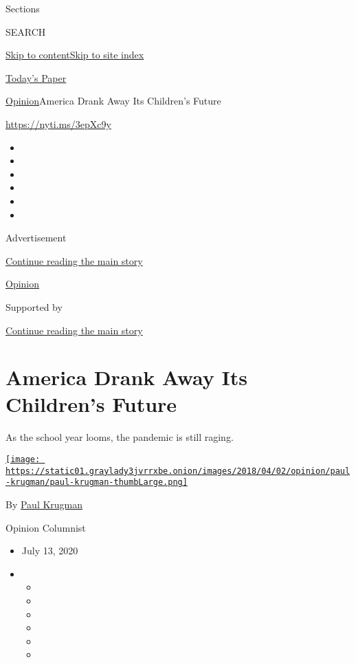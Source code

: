 Sections

SEARCH

\protect\hyperlink{site-content}{Skip to
content}\protect\hyperlink{site-index}{Skip to site index}

\href{https://myaccount.nytimes3xbfgragh.onion/auth/login?response_type=cookie\&client_id=vi}{}

\href{https://www.nytimes3xbfgragh.onion/section/todayspaper}{Today's
Paper}

\href{/section/opinion}{Opinion}\textbar{}America Drank Away Its
Children's Future

\url{https://nyti.ms/3epXc9y}

\begin{itemize}
\item
\item
\item
\item
\item
\item
\end{itemize}

Advertisement

\protect\hyperlink{after-top}{Continue reading the main story}

\href{/section/opinion}{Opinion}

Supported by

\protect\hyperlink{after-sponsor}{Continue reading the main story}

\hypertarget{america-drank-away-its-childrens-future}{%
\section{America Drank Away Its Children's
Future}\label{america-drank-away-its-childrens-future}}

As the school year looms, the pandemic is still raging.

\href{https://www.nytimes3xbfgragh.onion/by/paul-krugman}{\texttt{[image: https://static01.graylady3jvrrxbe.onion/images/2018/04/02/opinion/paul-krugman/paul-krugman-thumbLarge.png]}}

By \href{https://www.nytimes3xbfgragh.onion/by/paul-krugman}{Paul
Krugman}

Opinion Columnist

\begin{itemize}
\item
  July 13, 2020
\item
  \begin{itemize}
  \item
  \item
  \item
  \item
  \item
  \item
  \end{itemize}
\end{itemize}

